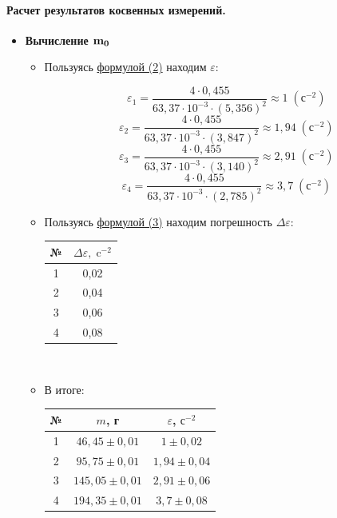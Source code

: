 \documentclass{article}
\begin{document}
\paragraph{Расчет результатов косвенных измерений.}

\begin{itemize}
	\item {\bf Вычисление $\bf m_0$}
	
	
\begin{itemize}
	\item Пользуясь \hyperlink{formuls}{формулой (2)} находим $\varepsilon$:
	
	$$\varepsilon_1=\frac{4\cdot0,455}{63,37\cdot10^{-3}\cdot(5,356)^2}\approx1\;\left( \mbox{с}^{-2} \right) $$
	$$\varepsilon_2=\frac{4\cdot0,455}{63,37\cdot10^{-3}\cdot(3,847)^2}\approx1,94\;\left( \mbox{с}^{-2} \right) $$
	$$\varepsilon_3=\frac{4\cdot0,455}{63,37\cdot10^{-3}\cdot(3,140)^2}\approx2,91\;\left( \mbox{с}^{-2} \right) $$
	$$\varepsilon_4=\frac{4\cdot0,455}{63,37\cdot10^{-3}\cdot(2,785)^2}\approx3,7\;\left( \mbox{с}^{-2} \right) $$

	\item Пользуясь \hyperlink{formuls}{формулой (3)} находим погрешность $\Delta \varepsilon$:
	
	\begin{tabular}{c|c}
		№ & $\Delta \varepsilon,\;\mbox{c}^{-2}$ \\
		\hline
		1 &  0,02\\
		
		2 &  0,04\\
		
		3 &  0,06\\
		
		4 &  0,08\\
	\end{tabular}\\

\item В итоге:

	\begin{tabular}{ c | c | c}
		№	& $m$, г& $\varepsilon$, $\mbox{с}^{-2}$ \\
		\hline
		1 & $46,45\pm0,01 $ &  $  1\pm0,02  $\\
		
		2& $ 95,75\pm0,01$ & $ 1,94\pm0,04  $ \\
		
		3& $145,05 \pm0,01 $&  $ 2,91 \pm0,06 $\\
		
		4& $ 194,35\pm0,01 $& $  3,7 \pm0,08$
	\end{tabular}\\


\end{itemize}
\end{itemize}
\end{document}
